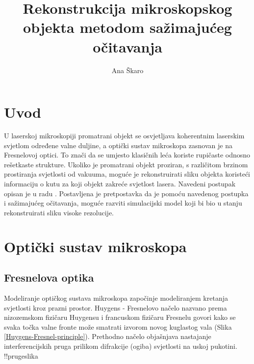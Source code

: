 \documentclass[times, utf8, diplomski, numeric]{fer}
\begin{document}

\title{Rekonstrukcija mikroskopskog objekta metodom sažimajućeg očitavanja}

\author{Ana Škaro}

\maketitle

\izvornik


\tableofcontents

\chapter{Uvod}

U laserskoj mikroskopiji promatrani objekt se osvjetljava koherentnim laserskim svjetlom određene valne duljine, a optički sustav mikroskopa zasnovan je na Fresnelovoj optici. To znači da se umjesto klasičnih leća koriste rupičaste odnosno rešetkaste strukture. Ukoliko je promatrani objekt proziran, s različitom brzinom prostiranja svjetlosti od vakuuma, moguće je rekonstruirati sliku objekta koristeći informaciju o kutu za koji objekt zakreće svjetlost lasera. Navedeni postupak opisan je u radu \citep{Morgan:11}. Postavljena je pretpostavka da je pomoću navedenog postupka i sažimajućeg očitavanja, moguće razviti simulacijski model koji bi bio u stanju rekonstruirati sliku visoke rezolucije.

\chapter{Optički sustav mikroskopa}



\section{Fresnelova optika}

Modeliranje optičkog sustava mikroskopa započinje modeliranjem kretanja svjetlosti kroz prazni prostor.
Huygens - Fresnelovo načelo nazvano prema nizozemskom fizičaru Huygensu i francuskom fizičaru Fresnelu govori kako se svaka točka valne fronte može smatrati izvorom novog kuglastog vala (Slika \ref{Huygens-Fresnel-principle}). Prethodno načelo objašnjava nastajanje interferencijskih pruga prilikom difrakcije (ogiba) svjetlosti na uskoj pukotini. !!prugeslika
\end{document}
